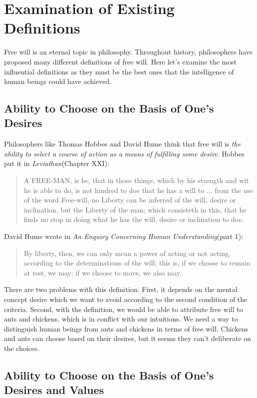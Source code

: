 \section{Examination of Existing Definitions}

Free will is an eternal topic in philosophy. Throughout history, philosophers have proposed many different definitions of free will. Here let’s examine the most influential definitions as they must be the best ones that the intelligence of human beings could have achieved.

\subsection{Ability to Choose on the Basis of One's Desires}

Philosophers like Thomas Hobbes and David Hume think that free will is \emph{the ability to select a course of action as a means of fulfilling some desire}. Hobbes put it in \emph{Leviathan}(Chapter XXI):

\begin{quote}
A FREE-MAN, is he, that in those things, which by his strength and wit he is able to do, is not hindred to doe that he has a will to ... from the use of the word Free-will, no Liberty can be inferred of the will, desire or inclination, but the Liberty of the man; which consisteth in this, that he finds no stop in doing what he has the will, desire or inclination to doe.
\end{quote}

David Hume wrote in \emph{An Enquiry Concerning Human Understanding}(part 1):

\begin{quote}
By liberty, then, we can only mean a power of acting or not acting, according to the determinations of the will; this is, if we choose to remain at rest, we may; if we choose to move, we also may.
\end{quote}

There are two problems with this definition. First, it depends on the mental concept desire which we want to avoid according to the second condition of the criteria. Second, with the definition, we would be able to attribute free will to ants and chickens, which is in conflict with our  intuitions. We need a way to distinguish human beings from ants and chickens in terms of free will. Chickens and ants can choose based on their desires, but it seems they can’t deliberate on the choices.

\subsection{Ability to Choose on the Basis of One’s Desires and Values}


